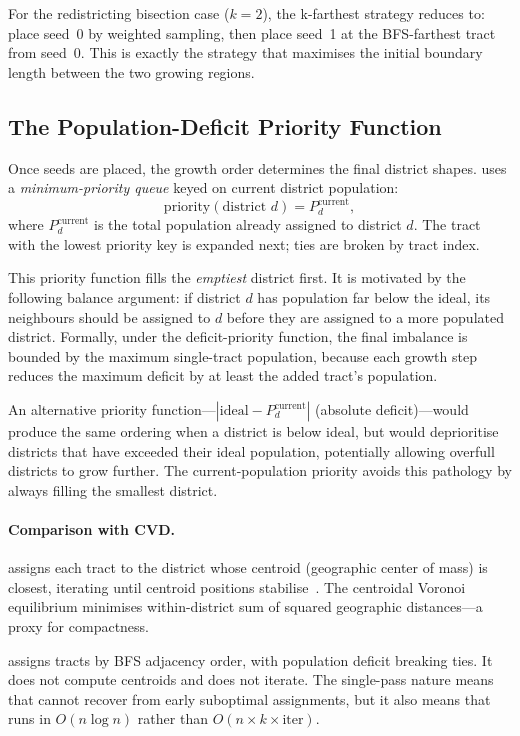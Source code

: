 For the redistricting bisection case ($k=2$), the k-farthest strategy
reduces to: place seed~0 by weighted sampling, then place seed~1 at the
BFS-farthest tract from seed~0.
This is exactly the strategy that maximises the initial boundary length
between the two growing regions.

\subsection{The Population-Deficit Priority Function}

Once seeds are placed, the growth order determines the final district shapes.
\bfsg{} uses a \emph{minimum-priority queue} keyed on current district
population:
\[
  \text{priority}(\text{district } d) = P_d^{\mathrm{current}},
\]
where $P_d^{\mathrm{current}}$ is the total population already assigned
to district $d$.
The tract with the lowest priority key is expanded next; ties are broken
by tract index.

This priority function fills the \emph{emptiest} district first.
It is motivated by the following balance argument: if district $d$ has
population far below the ideal, its neighbours should be assigned to $d$
before they are assigned to a more populated district.
Formally, under the deficit-priority function, the final imbalance is
bounded by the maximum single-tract population, because each growth step
reduces the maximum deficit by at least the added tract's population.

An alternative priority function---$|\text{ideal} - P_d^{\mathrm{current}}|$
(absolute deficit)---would produce the same ordering when a district is
below ideal, but would deprioritise districts that have exceeded their
ideal population, potentially allowing overfull districts to grow further.
The current-population priority avoids this pathology by always filling
the smallest district.

\paragraph{Comparison with CVD.}
\cvd{} assigns each tract to the district whose centroid (geographic center
of mass) is closest, iterating until centroid positions stabilise~\citep{du1999}.
The centroidal Voronoi equilibrium minimises within-district sum of squared
geographic distances---a proxy for compactness.

\bfsg{} assigns tracts by BFS adjacency order, with population deficit
breaking ties.
It does not compute centroids and does not iterate.
The single-pass nature means that \bfsg{} cannot recover from early
suboptimal assignments, but it also means that \bfsg{} runs in $O(n \log n)$
rather than $O(n \times k \times \text{iter})$.

